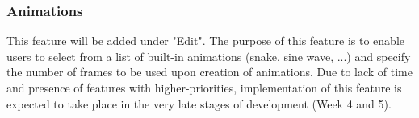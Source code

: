 \documentclass[]{article}
\begin{document}
\subsubsection{Animations}

{This feature will be added under "Edit". The purpose of this feature is to enable users to select from a list of built-in animations (snake, sine wave, ...) and specify the number of frames to be used upon creation of animations. Due to lack of time and presence of features with higher-priorities, implementation of this feature is expected to take place in the very late stages of development (Week 4 and 5). }
\end{document}
